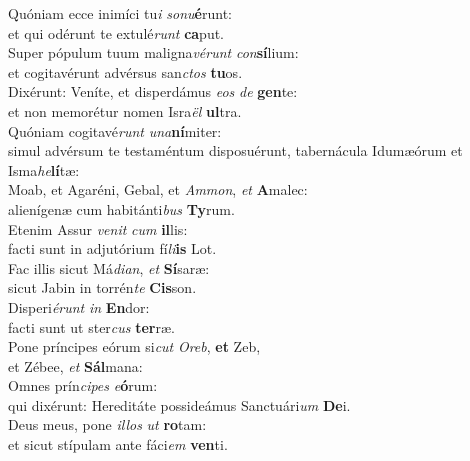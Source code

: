\evenverse Quóniam ecce inimíci tu\textit{i} \textit{so}\textit{nu}\textbf{é}runt:~\*\\
\evenverse et qui odérunt te extulé\textit{runt} \textbf{ca}put.\\
\oddverse Super pópulum tuum maligna\textit{vé}\textit{runt} \textit{con}\textbf{sí}lium:~\*\\
\oddverse et cogitavérunt advérsus san\textit{ctos} \textbf{tu}os.\\
\evenverse Dixérunt: Veníte, et disperdámus \textit{e}\textit{os} \textit{de} \textbf{gen}te:~\*\\
\evenverse et non memorétur nomen Isra\textit{ël} \textbf{ul}tra.\\
\oddverse Quóniam cogitavé\textit{runt} \textit{u}\textit{na}\textbf{ní}miter:~\*\\
\oddverse simul advérsum te testaméntum disposuérunt, tabernácula Idumæórum et Isma\textit{he}\textbf{lí}tæ:\\
\evenverse Moab, et Agaréni, Gebal, et \textit{Am}\textit{mon}, \textit{et} \textbf{A}malec:~\*\\
\evenverse alienígenæ cum habitánti\textit{bus} \textbf{Ty}rum.\\
\oddverse Etenim Assur \textit{ve}\textit{nit} \textit{cum} \textbf{il}lis:~\*\\
\oddverse facti sunt in adjutórium fí\textit{li}\textbf{is} Lot.\\
\evenverse Fac illis sicut Má\textit{di}\textit{an}, \textit{et} \textbf{Sí}saræ:~\*\\
\evenverse sicut Jabin in torrén\textit{te} \textbf{Cis}son.\\
\oddverse Disperi\textit{é}\textit{runt} \textit{in} \textbf{En}dor:~\*\\
\oddverse facti sunt ut ster\textit{cus} \textbf{ter}ræ.\\
\evenverse Pone príncipes eórum si\textit{cut} \textit{O}\textit{reb}, \textbf{et} Zeb,~\*\\
\evenverse et Zébee, \textit{et} \textbf{Sál}mana:\\
\oddverse Omnes prín\textit{ci}\textit{pes} \textit{e}\textbf{ó}rum:~\*\\
\oddverse qui dixérunt: Hereditáte possideámus Sanctuári\textit{um} \textbf{De}i.\\
\evenverse Deus meus, pone \textit{il}\textit{los} \textit{ut} \textbf{ro}tam:~\*\\
\evenverse et sicut stípulam ante fáci\textit{em} \textbf{ven}ti.\\
